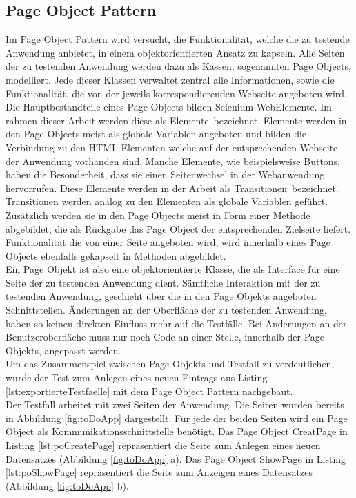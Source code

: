 \subsection{Page Object Pattern}
\label{sec:page_object_pattern}
Im Page Object Pattern wird versucht, die Funktionalität, welche die zu testende Anwendung anbietet, in einem objektorientierten Ansatz zu kapseln.
Alle Seiten der zu testenden Anwendung werden dazu als Kassen, sogenannten Page Objects, modelliert. Jede dieser Klassen verwaltet zentral alle Informationen, sowie die Funktionalität, die von der jeweils korrespondierenden Webseite angeboten wird. Die Hauptbestandteile eines Page Objects bilden Selenium-WebElemente. Im rahmen dieser Arbeit werden diese als \grq Elemente\grq\ bezeichnet. Elemente werden in den Page Objects meist als globale Variablen angeboten und bilden die Verbindung zu den HTML-Elementen welche auf der entsprechenden Webseite der Anwendung vorhanden sind. Manche Elemente, wie beispielsweise Buttons, haben die Besonderheit, dass sie einen Seitenwechsel in der Webanwendung hervorrufen. Diese Elemente werden in der Arbeit als \grq Transitionen\grq\ bezeichnet. Transitionen werden analog zu den Elementen als globale Variablen geführt. Zusätzlich werden sie in den Page Objects meist in Form einer Methode abgebildet, die als Rückgabe das Page Object der entsprechenden Zielseite liefert. Funktionalität die von einer Seite angeboten wird, wird innerhalb eines Page Objects ebenfalls gekapselt in Methoden abgebildet.\\
Ein Page Objekt ist also eine objektorientierte Klasse, die als Interface für eine Seite der zu testenden Anwendung dient.
Sämtliche Interaktion mit der zu testenden Anwendung, geschieht über die in den Page Objekts angeboten Schnittstellen.
Änderungen an der Oberfläche der zu testenden Anwendung, haben so keinen direkten Einfluss mehr auf die Testfälle. Bei Änderungen an der Benutzeroberfläche muss nur noch Code an einer Stelle, innerhalb der Page Objekts, angepasst werden.\\
Um das Zusammenspiel zwischen Page Objekts und Testfall zu verdeutlichen, wurde der Test zum Anlegen eines neuen Eintrags aus Listing \ref{lst:exportierteTestfaelle} mit dem Page Object Pattern nachgebaut.\\
Der Testfall arbeitet mit zwei Seiten der Anwendung. Die Seiten wurden bereits in Abbildung \ref{fig:toDoApp} dargestellt. Für jede der beiden Seiten wird ein Page Object als Kommunikationsschnittstelle benötigt. 
Das Page Object CreatPage in Listing \ref{lst:poCreatePage} repräsentiert die Seite zum Anlegen eines neuen Datensatzes (Abbildung \ref{fig:toDoApp} a). Das Page Object ShowPage in Listing \ref{lst:poShowPage} repräsentiert die Seite zum Anzeigen eines Datensatzes (Abbildung \ref{fig:toDoApp} b).

